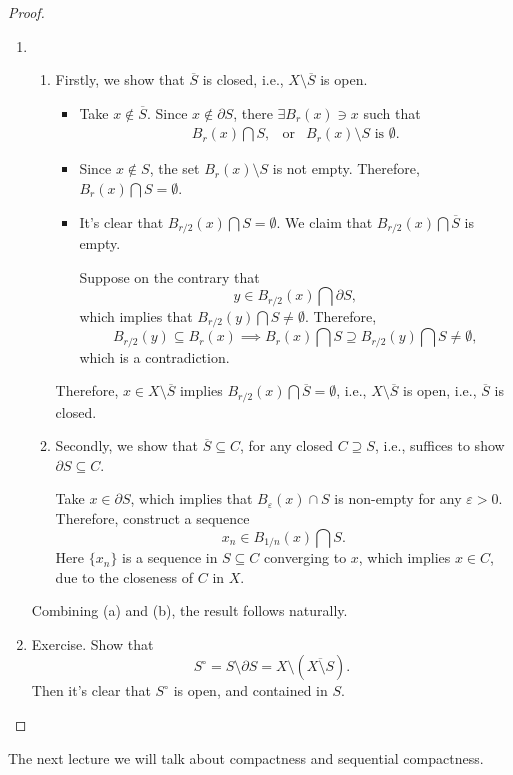 \begin{proof}
\begin{enumerate}
\item
\begin{enumerate}
\item
Firstly, we show that $\overline{S}$ is closed, i.e., $X\setminus\overline{S}$ is open.
\begin{itemize}
\item
Take $x\notin\overline{S}$. Since $x\notin\partial S$, there $\exists B_r(x)\ni x$ such that 
\[
\begin{array}{lll}
B_r(x)\bigcap S,
&
\text{or}
&
B_r(x)\setminus S\text{ is }\emptyset.
\end{array}
\]
\item
Since $x\notin S$, the set $B_r(x)\setminus S$ is not empty. Therefore, $B_r(x)\bigcap S=\emptyset$.
\item
It's clear that $B_{r/2}(x)\bigcap S=\emptyset$. We claim that $B_{r/2}(x)\bigcap \overline{S}$ is empty.

Suppose on the contrary that
\[
y\in B_{r/2}(x)\bigcap\partial S,
\]
which implies that $B_{r/2}(y)\bigcap S\ne\emptyset$. Therefore,
\[
B_{r/2}(y)\subseteq B_r(x)\implies 
B_r(x)\bigcap S\supseteq B_{r/2}(y)\bigcap S\ne\emptyset,
\]
which is a contradiction.
\end{itemize}
Therefore, $x\in X\setminus\overline{S}$ implies $B_{r/2}(x)\bigcap\overline{S}=\emptyset$, i.e., $X\setminus\overline{S}$ is open, i.e., $\overline{S}$ is closed.
\item
Secondly, we show that $\overline{S}\subseteq C$, for any closed $C\supseteq S$, i.e., suffices to show $\partial S\subseteq C$.

Take $x\in\partial S$, which implies that $B_{\varepsilon}(x)\cap S$ is non-empty for any $\varepsilon>0$. Therefore, construct a sequence
\[
x_n\in B_{1/n}(x)\bigcap S.
\] 
Here $\{x_n\}$ is a sequence in $S\subseteq C$ converging to $x$, 
which implies $x\in C$, 
due to the closeness of $C$ in $X$.
\end{enumerate}
Combining (a) and (b), the result follows naturally. 
\item
Exercise. Show that 
\[
S^\circ=S\setminus \partial S=X\setminus(\overline{X\setminus S}).
\]
Then it's clear that $S^\circ$ is open, and contained in $S$.
\end{enumerate}
\end{proof}

The next lecture we will talk about compactness and sequential compactness.











